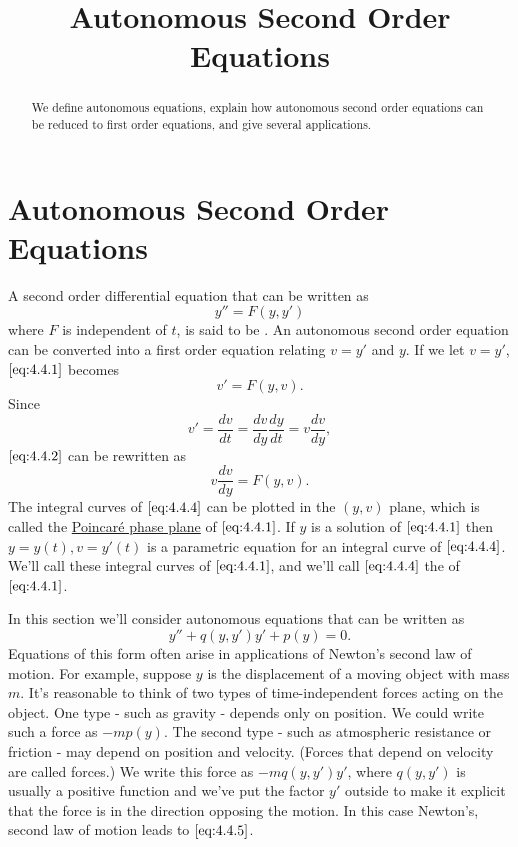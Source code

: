 \documentclass{ximera}
\title{Autonomous Second Order Equations}%
\begin{document}
 
\begin{abstract}
 We define autonomous equations, explain how autonomous second order equations can be reduced to first order equations, and give several applications.
\end{abstract}
 
\maketitle
 
\section*{Autonomous Second Order Equations}
 
A second order differential equation that can be written as
\begin{equation}\label{eq:4.4.1}
y''=F(y,y')
\end{equation}
where $F$ is independent of $t$, is said to be .
An autonomous second order equation can be converted into a first
order equation relating $v=y'$ and $y$. If we let $v=y'$,
$\eqref{eq:4.4.1}$ becomes
\begin{equation}\label{eq:4.4.2}
v'=F(y,v).
\end{equation}
Since
\begin{equation}\label{eq:4.4.3}
v'=\frac{dv}{dt}=\frac{dv}{dy}\frac{dy}{dt}=v\frac{dv}{dy},
\end{equation}
$\eqref{eq:4.4.2}$ can be rewritten as
\begin{equation}\label{eq:4.4.4}
v\frac{dv}{dy}=F(y,v).
\end{equation}
The integral curves of $\eqref{eq:4.4.4}$ can be plotted in the $(y,v)$
plane, which is called the
\href{http://www-history.mcs.st-and.ac.uk/Mathematicians/Poincare.html}{Poincar\'e phase plane} of $\eqref{eq:4.4.1}$. If $y$ is a solution of
$\eqref{eq:4.4.1}$
then $y=y(t), v=y'(t)$ is a parametric equation for an integral curve
of $\eqref{eq:4.4.4}$. We'll call these integral curves  of $\eqref{eq:4.4.1}$, and we'll call
$\eqref{eq:4.4.4}$ the  of $\eqref{eq:4.4.1}$.
 
In this section we'll consider  autonomous equations
that can be written as
\begin{equation}\label{eq:4.4.5}
y''+q(y,y')y'+p(y)=0.
\end{equation}
Equations of this form often arise in applications of Newton's second
law of motion. For example, suppose  $y$ is the displacement of a
moving object with mass $m$. It's  reasonable to think of two
types of time-independent forces acting on the object. One type - such
as gravity - depends only on position. We could write such a force as
$-mp(y)$. The second type - such as atmospheric resistance or friction
- may depend on position and velocity. (Forces that depend on velocity
are called  forces.) We  write this force as
$-mq(y,y')y'$, where $q(y,y')$ is usually a positive function and
we've put the factor $y'$ outside  to make it
explicit that the force
is in the direction opposing the motion. In this case Newton's, second
law of motion leads to $\eqref{eq:4.4.5}$.
 
\end{document}
